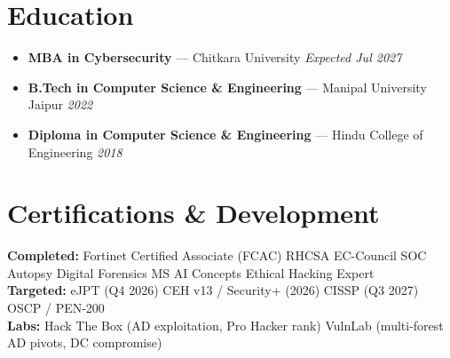\documentclass[10pt,a4paper]{article}
\begin{document}
\section{Education}
\begin{itemize}[leftmargin=0.15in, itemsep=1pt, topsep=1pt]
  \item \footnotesize\textbf{MBA in Cybersecurity} --- Chitkara University \hfill \textit{Expected Jul 2027}
  \item \footnotesize\textbf{B.Tech in Computer Science \& Engineering} --- Manipal University Jaipur \hfill \textit{2022}
  \item \textbf{Diploma in Computer Science \& Engineering} --- Hindu College of Engineering \hfill \textit{2018}
\end{itemize}

\section{Certifications \& Development}
\footnotesize
\textbf{Completed:} Fortinet Certified Associate (FCAC) \textbullet{} RHCSA \textbullet{} EC-Council SOC \textbullet{} Autopsy Digital Forensics \textbullet{} MS AI Concepts \textbullet{} Ethical Hacking Expert \\
\textbf{Targeted:} eJPT (Q4 2026) \textbullet{} CEH v13 / Security+ (2026) \textbullet{} CISSP (Q3 2027) \textbullet{} OSCP / PEN-200 \\
\textbf{Labs:} Hack The Box (AD exploitation, Pro Hacker rank) \textbullet{} VulnLab (multi-forest AD pivots, DC compromise)
\end{document}

